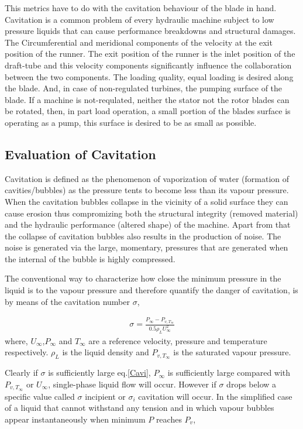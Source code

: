 This metrics have to do with the cavitation behaviour of the blade in hand. Cavitation is a common problem of every hydraulic machine subject to low pressure liquids that can cause performance breakdowns and structural damages. The Circumferential and meridional components of the velocity at the exit position of the runner. The exit position of the runner is the inlet position of the draft-tube and this velocity components significantly influence the collaboration between the two components. The loading quality, equal loading is desired along the blade. And, in case of non-regulated turbines, the pumping surface of the blade. If a machine is not-requlated, neither the stator not the rotor blades can be rotated, then, in part load operation, a small portion of the blades surface is operating as a pump, this surface is desired to be as small as possible.       

\subsection{Evaluation of Cavitation}
Cavitation is defined as the phenomenon of vaporization of water (formation of cavities/bubbles) as the pressure tents to become less than its vapour pressure. When the cavitation bubbles collapse in the vicinity of a solid surface they can cause erosion\cite{thiruvengadam1974handbook,knapp1970cavitation,brennen1995cavitation} thus compromizing both the structural integrity (removed material) and the hydraulic performance (altered shape) of the machine.  Apart from that the collapse of cavitation bubbles also results in the production of noise. The noise is generated via the large, momentary, pressures that are generated when the internal of the bubble is highly compressed.

The conventional way to characterize how close the minimum pressure in the liquid is to the vapour pressure and therefore quantify the danger of cavitation, is by means of the cavitation number $\sigma$,

\begin{eqnarray}
		\sigma=\frac{P_{\infty}-P_{v,T_{\infty}}}{0.5\rho_{L}U^2_{\infty}}
\label{Cavi}
\end{eqnarray}
where, $U_{\infty}$,$P_{\infty}$ and $T_{\infty}$ are a reference velocity, pressure and temperature respectively. $\rho_{L}$ is the liquid density and $P_{v,T_{\infty}}$  is the saturated vapour pressure. 

Clearly if $\sigma$ is sufficiently large eq.\ref{Cavi}, $P_{\infty}$ is sufficiently large compared with $P_{v,T_{\infty}}$ or $U_{\infty}$, single-phase liquid flow will occur. However if $\sigma$ drops below a specific value called $\sigma$ incipient or $\sigma_i$ cavitation will occur. In the simplified case of a liquid that cannot withstand any tension and in which vapour bubbles appear instantaneously when minimum $P$ reaches $P_{v}$,

